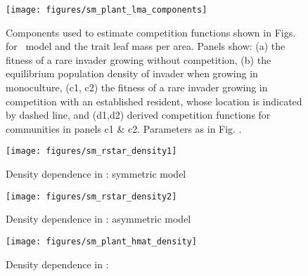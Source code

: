 \documentclass[10pt,twoside]{article}
\begin{document}
\begin{figure}[h]
 \centering
 \texttt{[image: figures/sm\_plant\_lma\_components]}
 \caption{Components used to estimate competition functions shown in Figs.
 {\figPlantLma} for \plant\ model and the trait leaf mass per area.
  Panels show: (a) the fitness of a rare invader growing without competition,
  (b) the equilibrium population density of invader when growing in monoculture,
  (c1, c2) the fitness of a rare invader growing in competition with an established
  resident, whose location is indicated by dashed line, and (d1,d2) derived competition
  functions for communities in panels  c1 \& c2. Parameters as in Fig.
  {\figPlantLma}.}
  \label{fig:sm_plant_lma_components}
\end{figure}

\begin{figure}[h]
  \centering
  \texttt{[image: figures/sm\_rstar\_density1]}
  \caption{Density dependence in \Rstar: symmetric model}
  \label{fig:rstar_density_dependence}
\end{figure}

\begin{figure}[h]
  \centering
  \texttt{[image: figures/sm\_rstar\_density2]}
  \caption{Density dependence in \Rstar: asymmetric model}
  \label{fig:rstar_density_dependence}
\end{figure}

\begin{figure}[h]
  \centering
  \texttt{[image: figures/sm\_plant\_hmat\_density]}
  \caption{Density dependence in \plant: \hmat}
  \label{fig:plant_hmat_density_dependence}
\end{figure}

% 
% 
\end{document}

